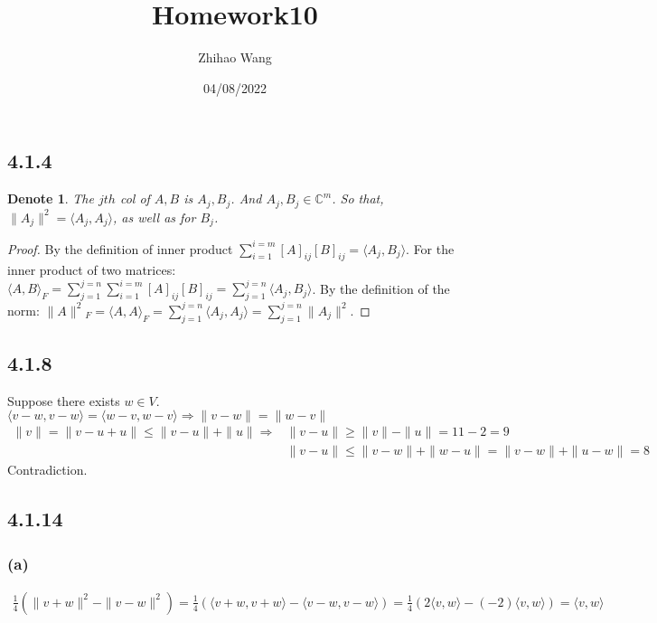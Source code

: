 \documentclass{article}
\title{Homework10}
\author{Zhihao Wang}
\date{04/08/2022}
\newtheorem*{denote}{Denote}
\newtheorem*{proof}{Proof}
\begin{document}
\maketitle 

\subsection*{4.1.4}
\begin{denote}
    The $jth$ col of $A, B$ is $A_j, B_j$. And $A_j, B_j \in \mathbb{C}^m$. So that, $\|A_j\|^2 = \langle A_j, A_j\rangle$, as well as for $B_j$.
\end{denote}
\begin{proof}
    By the definition of inner product $\sum_{i=1}^{i=m} [A]_{ij}[B]_{ij} =\langle A_j, B_j \rangle$.
    For the inner product of two matrices: $\langle A, B\rangle _{F} =\sum_{j=1}^{j=n} \sum_{i=1}^{i=m} [A]_{ij}[B]_{ij} =\sum_{j=1}^{j=n} \langle A_j, B_j \rangle$. 
    By the definition of the norm: $\|A\|^2 {_F}  = \langle A, A \rangle _F = \sum_{j=1}^{j=n} \langle A_j, A_j \rangle = \sum_{j=1}^{j=n}\|A_j\|^2$.
\end{proof}

\subsection*{4.1.8}
\noindent Suppose there exists $w \in V$. $\langle v - w, v - w \rangle = \langle w - v, w - v \rangle \Rightarrow \|v - w\| = \|w - v\|$
\begin{equation*}
    \begin{split}
          \|v\| = \|v - u + u\| \le \|v - u\| + \|u\| \Rightarrow &\|v - u\| \ge \|v\| - \|u\| = 11 - 2 = 9 \\
        & \|v - u\| \le \|v-w\| + \|w - u\| = \|v-w\| + \|u - w\| = 8
    \end{split}
\end{equation*}
Contradiction.

\subsection*{4.1.14}
\subsubsection*{(a)}
\begin{equation*}
    \begin{split}
        \frac 1 4 (\|v + w\|^2 - \|v - w\|^2) = \frac 1 4 (\langle v+w, v+w\rangle - \langle v-w, v-w \rangle) = \frac 1 4(2 \langle v, w \rangle - (-2) \langle v, w \rangle) = \langle v, w \rangle
    \end{split}
\end{equation*}
\end{document}
